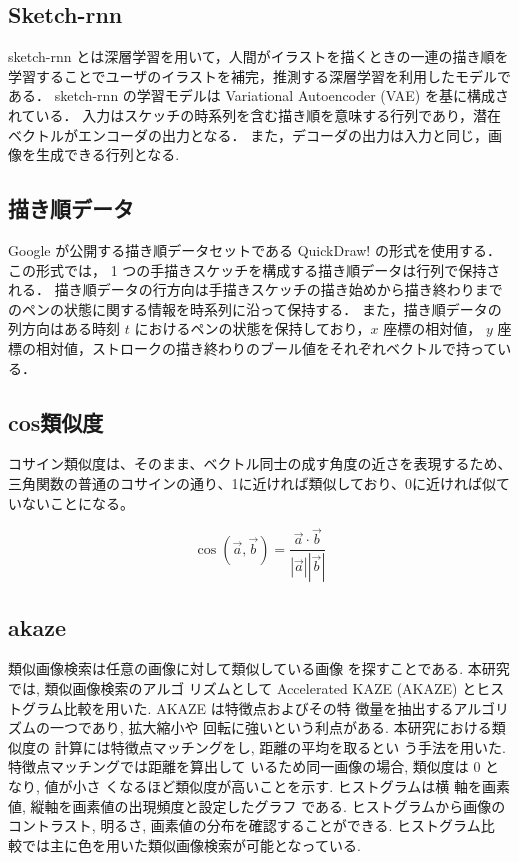 \documentclass[twocolumn]{jarticle}     %
\begin{document}
  \subsection{Sketch-rnn}	\label{tau}
    sketch-rnn とは深層学習を用いて，人間がイラストを描くときの一連の描き順を学習することでユーザのイラストを補完，推測する深層学習を利用したモデルである．
    sketch-rnn の学習モデルは Variational Autoencoder (VAE) を基に構成されている．
    入力はスケッチの時系列を含む描き順を意味する行列であり，潜在ベクトルがエンコーダの出力となる．
    また，デコーダの出力は入力と同じ，画像を生成できる行列となる.


	\subsection{描き順データ}
		Google が公開する描き順データセットである QuickDraw! \cite{Cheema:2012:QID:2207676.2208550} の形式を使用する．
		この形式では， 1 つの手描きスケッチを構成する描き順データは行列で保持される．
		描き順データの行方向は手描きスケッチの描き始めから描き終わりまでのペンの状態に関する情報を時系列に沿って保持する．
		また，描き順データの列方向はある時刻 $t$ におけるペンの状態を保持しており，$x$ 座標の相対値， $y$ 座標の相対値，ストロークの描き終わりのブール値をそれぞれベクトルで持っている．

    \subsection{cos類似度}
コサイン類似度は、そのまま、ベクトル同士の成す角度の近さを表現するため、三角関数の普通のコサインの通り、1に近ければ類似しており、0に近ければ似ていないことになる。

\begin{equation}
  \cos( \overrightarrow{a}, \overrightarrow{b} ) =
  \frac{\overrightarrow{a} \cdot \overrightarrow{b}}{|\overrightarrow{a}| |\overrightarrow{b}|}
\end{equation}

    \subsection{akaze}
類似画像検索は任意の画像に対して類似している画像
を探すことである. 本研究では, 類似画像検索のアルゴ
リズムとして Accelerated KAZE (AKAZE) \cite{alcantarilla2011fast} とヒス
トグラム比較を用いた. AKAZE は特徴点およびその特
徴量を抽出するアルゴリズムの一つであり, 拡大縮小や
回転に強いという利点がある. 本研究における類似度の
計算には特徴点マッチングをし, 距離の平均を取るとい
う手法を用いた. 特徴点マッチングでは距離を算出して
いるため同一画像の場合, 類似度は 0 となり, 値が小さ
くなるほど類似度が高いことを示す. ヒストグラムは横
軸を画素値, 縦軸を画素値の出現頻度と設定したグラフ
である. ヒストグラムから画像のコントラスト, 明るさ,
画素値の分布を確認することができる. ヒストグラム比
較では主に色を用いた類似画像検索が可能となっている.
\end{document}
